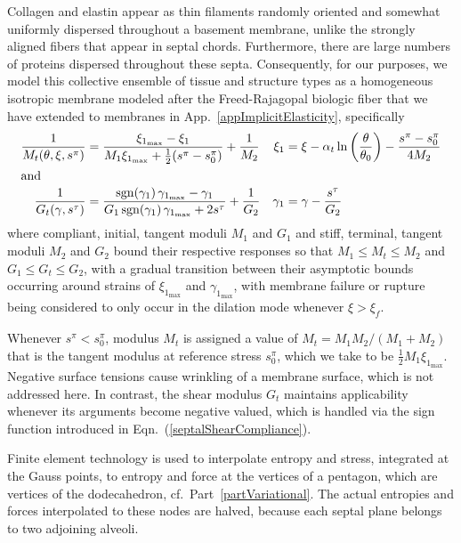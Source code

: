 Collagen and elastin appear as thin filaments randomly oriented and somewhat uniformly dispersed throughout a basement membrane, unlike the strongly aligned fibers that appear in septal chords.  Furthermore, there are large numbers of proteins dispersed throughout these septa.  Consequently, for our purposes, we model this collective ensemble of tissue and structure types as a homo\-geneous isotropic membrane modeled after the Freed-Rajagopal biologic fiber \cite{FreedRajagopal16} that we have extended to membranes in App.~\ref{appImplicitElasticity}, specifically
\begin{subequations}
    \label{septalCompliances}
    \begin{align}
    \frac{1}{M_t(\theta, \xi, s^{\pi})} & = 
    \frac{\xi_{1_{\max}} - \xi_1}
    {M_1 \xi_{1_{\max}} + \tfrac{1}{2}(s^{\pi} - s^{\pi}_0)} + \frac{1}{M_2} 
    & \xi_1 & = \xi - \alpha_t \ln 
    \left( \frac{\theta}{\theta_0} \right) - \frac{s^{\pi} - s^{\pi}_0}{4M_2}
    \label{septalDilationCompliance} \\
    \intertext{and}
    \frac{1}{G_t(\gamma , s^{\tau})} & = \frac{ \mathrm{sgn} (\gamma_1) \, \gamma_{1_{\max}} - \gamma_1}{G_1 \, \mathrm{sgn} (\gamma_1) \, \gamma_{1_{\max}} + 2 s^{\tau}} + \frac{1}{G_2} & 
    \gamma_1 & = \gamma - \frac{s^{\tau}}{G_2}
    \label{septalShearCompliance}
    \end{align}
\end{subequations}
where compliant, initial, tangent moduli $M_1$ and $G_1$ and stiff, terminal, tangent moduli $M_2$ and $G_2$ bound their respective responses so that $M_1 \leq M_t \leq M_2$ and $G_1 \leq G_t \leq G_2$, with a gradual transition between their asymp\-totic bounds occurring around strains of $\xi_{1_{\max}}$ and $\gamma_{1_{\max}}$, with membrane failure or rupture being considered to only occur in the dilation mode whenever $\xi > \xi_f$.

Whenever $s^{\pi} < s^{\pi}_0$, modulus $M_t$ is assigned a value of $M_t = M_1 M_2 / ( M_1 + M_2 )$ that is the tangent modulus at reference stress $s^{\pi}_0$, which we take to be $\tfrac{1}{2} M_1 \xi_{1_{\max}}$.   Negative surface tensions cause wrinkling of a membrane surface, which is not addressed here.  In contrast, the shear modulus $G_t$ maintains applicability whenever its arguments become negative valued, which is handled via the sign function introduced in Eqn.~(\ref{septalShearCompliance}).

Finite element technology is used to interpolate entropy and stress, integrated at the Gauss points, to entropy and force at the vertices of a pentagon, which are vertices of the dodecahedron, cf.\ Part~\ref{partVariational}.  The actual entropies and forces interpolated to these nodes are halved, because each septal plane belongs to two adjoining alveoli. 

